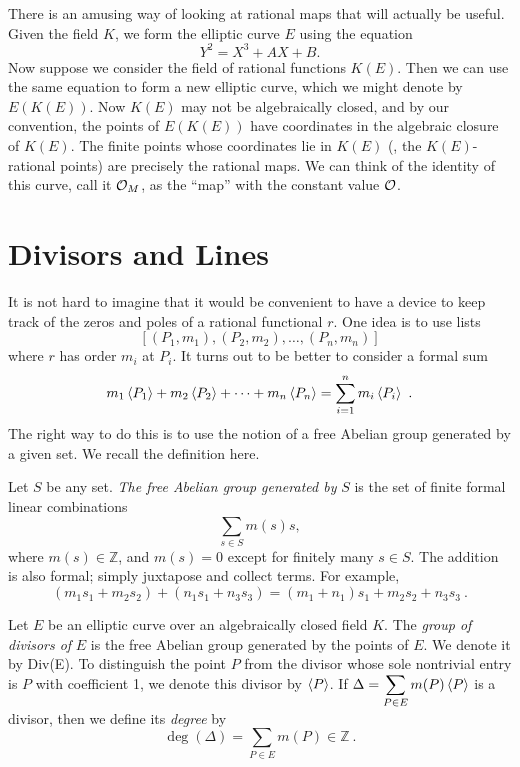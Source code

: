 \rem 
\label{specialremark}
There is an amusing way of looking at rational maps that will actually be useful. Given the field $K$, we form the elliptic curve $E$ using the equation
\begin{equation}
\label{eq1.4}
Y^{2}=X^{3}+AX+B .
\end{equation}
Now suppose we consider the field of rational functions $K(E)$. Then we can use the same equation to form a new elliptic curve, which we might denote by $E(K(E))$. Now $K(E)$ may not be algebraically closed, and by our convention, the points of $E(K(E))$ have coordinates in the algebraic closure of $K(E)$. The finite points whose coordinates lie in $K(E)$ (\ie, the $K(E)$-rational points) are precisely the rational maps. We can think of the identity of this curve, call it $\mathcal{O}_{M}$, as the ``map'' with the constant value $\mathcal{O}$.

\section{Divisors and Lines}

It is not hard to imagine that it would be convenient to have a device to keep track of the zeros and poles of a rational functional $r$. One idea is to use lists
$$
[(P_{1},m_{1}),(P_{2},m_{2}),\ldots,(P_{n},m_{n})]
$$
where $r$ has order $m_{i}$ at $P_{i}$. It turns out to be better to consider a formal sum
$$
 m_{1}\divisor{P_{1}} + m_{2} \divisor{P_{2}} + \cdots + m_{n} \divisor{P_{n}} = \sum_{i=1}^{n}m_{i} \divisor{P_{i}}\ .
$$
The right way to do this is to use the notion of a free Abelian group generated by a given set. We recall the definition here.

\begin{defi}
\label{d5.1}
Let $S$ be any set. {\it The free Abelian group generated by} $S$ is the set of finite formal linear combinations
$$
\sum_{s\in S}m(s)s,
$$
where $m(s)\in \mathbb{Z}$, and $m(s)=0$ except for finitely many $s\in S$. The addition is also formal; simply juxtapose and collect terms. For example,
$$
(m_{1}s_{1}+m_{2}s_{2})+(n_{1}s_{1}+n_{3}s_{3})=(m_{1}+n_{1})s_{1}+m_{2}s_{2}+n_{3}s_{3}\ .
$$
\end{defi}

\begin{defi}
\label{d5.2}
Let $E$ be an elliptic curve over an algebraically closed field $K$. The {\it group of divisors of} $E$ is the free Abelian group generated by the points of $E$. We denote it by Div(E). To distinguish the point $P$ from the divisor whose sole nontrivial entry is $P$ with coefficient 1, we denote this divisor by $\left\langle P \right \rangle$. If $\displaystyle \Delta=\sum_{P\in E}m(P)\left\langle P \right \rangle$ is a divisor, then we define its {\it degree} by
$$
\deg(\Delta)=\sum_{P\in E}m(P)\in \mathbb{Z}\ .
$$
\end{defi}

